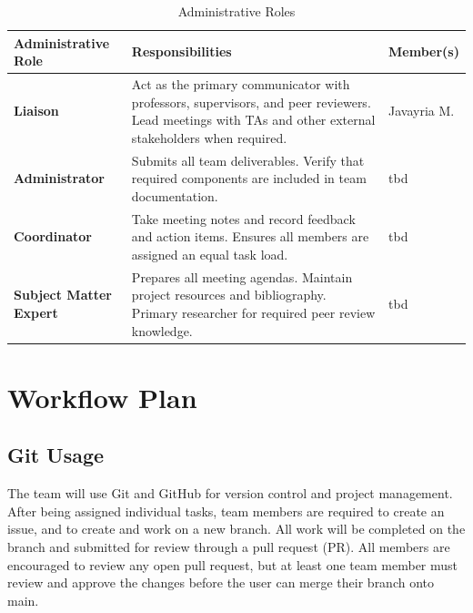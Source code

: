 \documentclass{article}
\begin{document}
\begin{table}[H]
    \caption{Administrative Roles}\label{TblAdministrativeRoles}
    \renewcommand{\arraystretch}{1.1}
    \setlength{\tabcolsep}{5pt}
    \begin{tabularx}{\textwidth}{p{3cm} X p{3cm}}
    \toprule
    \textbf{Administrative Role} & \textbf{Responsibilities} & \textbf{Member(s)}\\
    \midrule

    \textbf{Liaison}
    & Act as the primary communicator with professors, supervisors, and peer reviewers. Lead meetings with TAs and other external stakeholders when required.
    & Javayria M.
    \\
    \midrule

    \textbf{Administrator}
    & Submits all team deliverables. Verify that required components are included in team documentation.
    & tbd
    \\
    \midrule

    \textbf{Coordinator}
    & Take meeting notes and record feedback and action items. Ensures all members are assigned an equal task load.
    & tbd
    \\
    \midrule

    \textbf{Subject Matter Expert}
    & Prepares all meeting agendas. Maintain project resources and bibliography. Primary researcher for required peer review knowledge.
    & tbd
    \\

    \bottomrule
    \end{tabularx}
\end{table}


    
\section{Workflow Plan}

\subsection*{Git Usage}
The team will use Git and GitHub for version control and project management. After being
assigned individual tasks, team members are required to create an issue, and to create
and work on a new branch. All work will be completed on the branch and submitted for review through a pull request (PR).
All members are encouraged to review any open pull request, but 
at least one team member must review and approve the changes before the user
can merge their branch onto main. 
\end{document}
